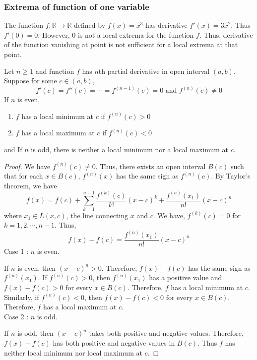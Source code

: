\subsubsection{Extrema of function of one variable}
\begin{commentary}
	The function $f : \mathbb{R} \to \mathbb{R}$ defined by $f(x) = x^3$ has derivative $f'(x) = 3x^2$.
	Thus $f'(0) = 0$.
	However, $0$ is not a local extrema for the function $f$.
	Thus, derivative of the function vanishing at point is not sufficient for a local extrema at that point.
\end{commentary}
\begin{theorem}
	Let $n \ge 1$ and function $f$ has $n$th partial derivative in open interval $(a,b)$.
	Suppose for some $c \in (a,b)$,
	\[ f'(c) = f''(c) = \cdots = f^{(n-1)}(c) = 0 \text{ and } f^{(n)}(c) \ne 0 \]
	If $n$ is even,
\begin{enumerate}
	\item $f$ has a local minimum at $c$ if $f^{(n)}(c)>0$
	\item $f$ has a local maximum at $c$ if $f^{(n)}(c) < 0$
\end{enumerate}
	and If $n$ is odd, there is neither a local minimum nor a local maximum at $c$.
\end{theorem}
\begin{proof}
	We have $f^{(n)}(c) \ne 0$.
	Thus, there exists an open interval $B(c)$ such that for each $x \in B(c)$, $f^{(n)}(x)$ has the same sign as $f^{(n)}(c)$.
	By Taylor's theorem, we have
	\begin{equation}
		f(x) = f(c) + \sum_{k = 1}^{n-1} \frac{f^{(k)}(c)}{k!}(x-c)^k + \frac{f^{(n)}(x_1)}{n!} (x-c)^n
	\end{equation}
	where $x_1 \in L(x,c)$, the line connecting $x$ and $c$.
	We have, $f^{(k)}(c) = 0$ for $k = 1,2,\cdots,n-1$.
	Thus,
	\[ f(x)-f(c) = \frac{f^{(n)}(x_1)}{n!} (x-c)^n \]
	Case 1 : $n$ is even.

	If $n$ is even, then $(x-c)^n > 0$.
	Therefore, 
	$f(x)-f(c)$ has the same sign as $f^{(n)}(x_1)$.
	If $f^{(n)}(c) > 0$, then $f^{(n)}(x_1)$ has a positive value and $f(x)-f(c) > 0$ for every $x \in B(c)$.
	Therefore, $f$ has a local minimum at $c$.
	Similarly, if $f^{(n)}(c) < 0$, then $f(x)-f(c) < 0$ for every $x \in B(c)$.
	Therefore, $f$ has a local maximum at $c$.\\
	Case 2 : $n$ is odd.

	If $n$ is odd, then $(x-c)^n$ takes both positive and negative values.
	Therefore, $f(x) - f(c)$ has both positive and negative values in $B(c)$.
	Thus $f$ has neither local minimum nor local maximum at $c$.
\end{proof}

